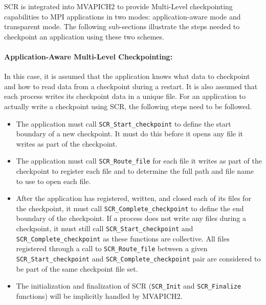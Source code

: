 SCR is integrated into MVAPICH2 to provide Multi-Level checkpointing
capabilities to MPI applications in two modes: application-aware mode and transparent
mode. The following sub-sections illustrate the steps needed to checkpoint an
application using these two schemes.

\paragraph{Application-Aware Multi-Level Checkpointing:}

In this case, it is assumed that the application knows what data to checkpoint
and how to read data from a checkpoint during a restart. It is also assumed that
each process writes its checkpoint data in a unique file. For an application to
actually write a checkpoint using SCR, the following steps need to be followed.

\begin{itemize}

\item The application must call \texttt{SCR\_Start\_checkpoint} to define the start
boundary of a new checkpoint. It must do this before it opens any file it writes
as part of the checkpoint.

\item The application must call \texttt{SCR\_Route\_file} for
each file it writes as part of the checkpoint to register each file and to
determine the full path and file name to use to open each file.

\item After the application has registered, written, and closed each of its
files for the checkpoint, it must call \texttt{SCR\_Complete\_checkpoint} to
define the end boundary of the checkpoint. If a process does not write any
files during a checkpoint, it must still call \texttt{SCR\_Start\_checkpoint}
and \\
\texttt{SCR\_Complete\_checkpoint} as these functions are collective. All
files registered through a call to \texttt{SCR\_Route\_file} between a given
\texttt{SCR\_Start\_checkpoint} and \texttt{SCR\_Complete\_checkpoint} pair
are considered to be part of the same checkpoint file set.

\item The initialization and finalization of SCR (\texttt{SCR\_Init} and
\texttt{SCR\_Finalize} functions) will be implicitly handled by MVAPICH2.

\end{itemize}

